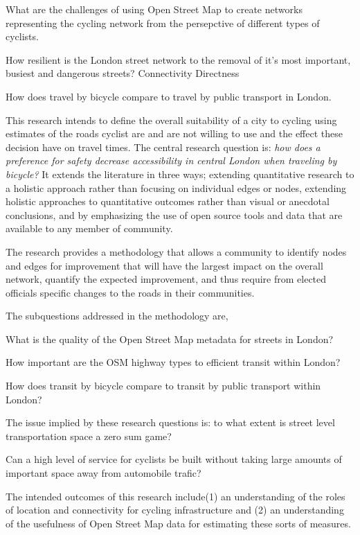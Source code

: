 What are the challenges of using Open Street Map to create networks representing the cycling network from the persepctive of different types of cyclists. 

How resilient is the London street network to the removal of it's most important, busiest and dangerous streets? 
	Connectivity
	Directness
	
How does travel by bicycle compare to travel by public transport in London. 




This research intends to define the overall suitability of a city to cycling using estimates of the roads cyclist are and are not willing to use and the effect these decision have on travel times. The central research question is: \textit{how does a preference for safety decrease accessibility in central London when traveling by bicycle?} It extends the literature in three ways; extending quantitative research to a holistic approach rather than focusing on individual edges or nodes, extending holistic approaches to quantitative outcomes rather than visual or anecdotal conclusions, and by emphasizing the use of open source tools and data that are available to any member of community. 

The research provides a methodology that allows a community to identify nodes and edges for improvement that will have the largest impact on the overall network, quantify the expected improvement, and thus require from elected officials specific changes to the roads in their communities. 

The subquestions addressed in the methodology are, 

What is the quality of the Open Street Map metadata for streets in London? 

How important are the OSM highway types to efficient transit within London? 

How does transit by bicycle compare to transit by public transport within London? 

The issue implied by these research questions is: to what extent is street level transportation space a zero sum game? 

Can a high level of service for cyclists be built without taking large amounts of important space away from automobile trafic? 

The intended outcomes of this research include(1) an understanding of the roles of location and connectivity for cycling infrastructure and (2) an understanding of the usefulness of Open Street Map data for estimating these sorts of measures. 


